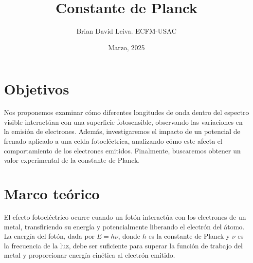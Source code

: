 \documentclass[twocolumn,a4paper,11pt]{scrartcl}
\title{Constante de Planck}
\author{Brian David Leiva. ECFM-USAC}
\date{Marzo, 2025}
\begin{document}

\section{Objetivos}
Nos proponemos examinar cómo diferentes longitudes de onda dentro del espectro visible interactúan con una superficie fotosensible, observando las variaciones en la emisión de electrones. Además, investigaremos el impacto de un potencial de frenado aplicado a una celda fotoeléctrica, analizando cómo este afecta el comportamiento de los electrones emitidos. Finalmente, buscaremos obtener un valor experimental de la constante de Planck.

\section{Marco teórico}

El efecto fotoeléctrico ocurre cuando un fotón interactúa con los electrones de un metal, transfiriendo su energía y potencialmente liberando el electrón del átomo. La energía del fotón, dada por $E = h\nu$, donde $h$ es la constante de Planck y $\nu$ es la frecuencia de la luz, debe ser suficiente para superar la función de trabajo del metal y proporcionar energía cinética al electrón emitido.
\end{document}
